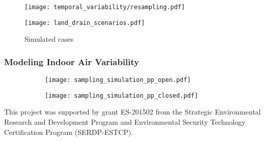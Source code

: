 \documentclass[journal=esthag,manuscript=article]{achemso}
\begin{document}
\begin{figure}[!h]
	\centering
	\begin{minipage}[c]{0.49\textwidth}
		\centering
    \caption{ }
    \label{fig:resampling}
    \texttt{[image: temporal\_variability/resampling.pdf]}
	\end{minipage}
	\begin{minipage}[c]{0.49\textwidth}
		\centering
    \caption{Simulated cases}
    \label{fig:land_drain_scenarios}
    \texttt{[image: land\_drain\_scenarios.pdf]}
	\end{minipage}
\end{figure}



\subsubsection{Modeling Indoor Air Variability}

\begin{figure}[htb!]
  \caption{ }
  \label{fig:simulation_sampling}
  \begin{subfigure}{0.49\textwidth}
    \centering
    \caption{ }
    \label{fig:simulation_sampling_pp_open}
    \texttt{[image: sampling\_simulation\_pp\_open.pdf]}
  \end{subfigure}
  \begin{subfigure}{0.49\textwidth}
    \centering
    \caption{ }
    \label{fig:simulation_sampling_pp_closed}
    \texttt{[image: sampling\_simulation\_pp\_closed.pdf]}
  \end{subfigure}
\end{figure}


\begin{acknowledgement}
  This project was supported by grant ES-201502 from the Strategic Environmental Research and Development Program and Environmental Security Technology Certification Program (SERDP-ESTCP).
\end{acknowledgement}


\end{document}
